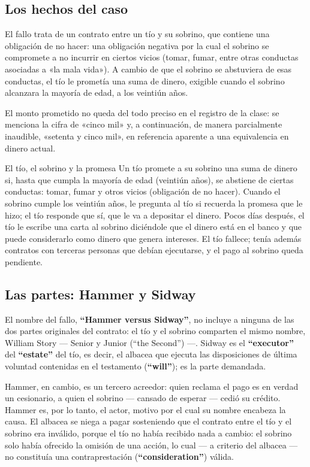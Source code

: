 \documentclass[12pt,oneside]{book}
\begin{document}
\subsection{Los hechos del caso}

El fallo trata de un contrato entre un tío y su sobrino, que contiene una obligación de no hacer: una obligación negativa por la cual el sobrino se compromete a no incurrir en ciertos vicios (tomar, fumar, entre otras conductas asociadas a «la mala vida»). A cambio de que el sobrino se abstuviera de esas conductas, el tío le prometía una suma de dinero, exigible cuando el sobrino alcanzara la mayoría de edad, a los veintiún años.

El monto prometido no queda del todo preciso en el registro de la clase: se menciona la cifra de «cinco mil» y, a continuación, de manera parcialmente inaudible, «setenta y cinco mil», en referencia aparente a una equivalencia en dinero actual.

\begin{example}{El tío, el sobrino y la promesa}
Un tío promete a su sobrino una suma de dinero si, hasta que cumpla la mayoría de edad (veintiún años), se abstiene de ciertas conductas: tomar, fumar y otros vicios (obligación de no hacer). Cuando el sobrino cumple los veintiún años, le pregunta al tío si recuerda la promesa que le hizo; el tío responde que sí, que le va a depositar el dinero. Pocos días después, el tío le escribe una carta al sobrino diciéndole que el dinero está en el banco y que puede considerarlo como dinero que genera intereses. El tío fallece; tenía además contratos con terceras personas que debían ejecutarse, y el pago al sobrino queda pendiente.
\end{example}

\subsection{Las partes: Hammer y Sidway}

El nombre del fallo, \textbf{``Hammer versus Sidway''}, no incluye a ninguna de las dos partes originales del contrato: el tío y el sobrino comparten el mismo nombre, William Story --- Senior y Junior (``the Second'') ---. Sidway es el \textbf{``executor''} del \textbf{``estate''} del tío, es decir, el albacea que ejecuta las disposiciones de última voluntad contenidas en el testamento (\textbf{``will''}); es la parte demandada.

Hammer, en cambio, es un tercero acreedor: quien reclama el pago es en verdad un cesionario, a quien el sobrino --- cansado de esperar --- cedió su crédito. Hammer es, por lo tanto, el actor, motivo por el cual su nombre encabeza la causa. El albacea se niega a pagar sosteniendo que el contrato entre el tío y el sobrino era inválido, porque el tío no había recibido nada a cambio: el sobrino solo había ofrecido la omisión de una acción, lo cual --- a criterio del albacea --- no constituía una contraprestación (\textbf{``consideration''}) válida.
\end{document}
